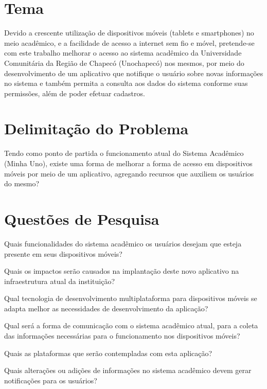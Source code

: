 \section{Tema}
Devido a crescente utilização de dispositivos móveis (tablets e smartphones) no meio acadêmico, e a facilidade de acesso a internet sem fio e móvel, pretende-se com este trabalho melhorar o acesso ao sistema acadêmico da Universidade Comunitária da Região de Chapecó (Unochapecó) nos mesmos, por meio do desenvolvimento de um aplicativo que notifique o usuário sobre novas informações no sistema e também permita a consulta aos dados do sistema conforme suas permissões, além de poder efetuar cadastros.

\section{Delimitação do Problema}
Tendo como ponto de partida o funcionamento atual do Sistema Acadêmico (Minha Uno), existe uma forma de melhorar a forma de acesso em dispositivos móveis por meio de um aplicativo, agregando recursos que auxiliem os usuários do mesmo?

\section{Questões de Pesquisa}
Quais funcionalidades do sistema acadêmico os usuários desejam que esteja presente em seus dispositivos móveis? 

Quais os impactos serão causados na implantação deste novo aplicativo na infraestrutura atual da instituição? 

Qual tecnologia de desenvolvimento multiplataforma para dispositivos móveis se adapta melhor as necessidades de desenvolvimento da aplicação? 

Qual será a forma de comunicação com o sistema acadêmico atual, para a coleta das informações necessárias para o funcionamento nos dispositivos móveis?

Quais as plataformas que serão contempladas com esta aplicação? 

Quais alterações ou adições de informações no sistema acadêmico devem gerar notificações para os usuários?
